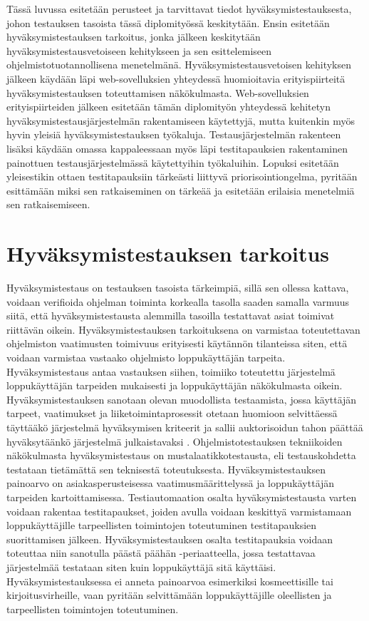 Tässä luvussa esitetään perusteet ja tarvittavat tiedot hyväksymistestauksesta, johon testauksen tasoista tässä diplomityössä keskitytään.
Ensin esitetään hyväksymistestauksen tarkoitus, jonka jälkeen keskitytään hyväksymistestausvetoiseen kehitykseen ja sen esittelemiseen ohjelmistotuotannollisena menetelmänä.
Hyväksymistestausvetoisen kehityksen jälkeen käydään läpi web-sovelluksien yhteydessä huomioitavia erityispiirteitä hyväksymistestauksen toteuttamisen näkökulmasta.
Web-sovelluksien erityispiirteiden jälkeen esitetään tämän diplomityön yhteydessä kehitetyn hyväksymistestausjärjestelmän rakentamiseen käytettyjä, mutta kuitenkin myös hyvin yleisiä hyväksymistestauksen työkaluja.
Testausjärjestelmän rakenteen lisäksi käydään omassa kappaleessaan myös läpi testitapauksien rakentaminen painottuen testausjärjestelmässä käytettyihin työkaluihin.
Lopuksi esitetään yleisestikin ottaen testitapauksiin tärkeästi liittyvä priorisointiongelma, pyritään esittämään miksi sen ratkaiseminen on tärkeää ja esitetään erilaisia menetelmiä sen ratkaisemiseen.

\section{Hyväksymistestauksen tarkoitus} \label{ch:08_hyvaksymistestauksen_tarkoitus}

  Hyväksymistestaus on testauksen tasoista tärkeimpiä, sillä sen ollessa kattava, voidaan verifioida ohjelman toiminta korkealla tasolla saaden samalla varmuus siitä, että hyväksymistestausta alemmilla tasoilla testattavat asiat toimivat riittävän oikein.
  Hyväksymistestauksen tarkoituksena on varmistaa toteutettavan ohjelmiston vaatimusten toimivuus erityisesti käytännön tilanteissa siten, että voidaan varmistaa vastaako ohjelmisto loppukäyttäjän tarpeita.
  Hyväksymistestaus antaa vastauksen siihen, toimiiko toteutettu järjestelmä loppukäyttäjän tarpeiden mukaisesti ja loppukäyttäjän näkökulmasta oikein.
  Hyväksymistestauksen sanotaan olevan muodollista testaamista, jossa käyttäjän tarpeet, vaatimukset ja liiketoimintaprosessit otetaan huomioon selvittäessä täyttääkö järjestelmä hyväksymisen kriteerit ja sallii auktorisoidun tahon päättää hyväksytäänkö järjestelmä julkaistavaksi \parencite{istqb_acceptance_testing_1}.
  Ohjelmistotestauksen tekniikoiden näkökulmasta hyväksymistestaus on mustalaatikkotestausta, eli testauskohdetta testataan tietämättä sen teknisestä toteutuksesta.
  Hyväksymistestauksen painoarvo on asiakasperusteisessa vaatimusmäärittelyssä ja loppukäyttäjän tarpeiden kartoittamisessa.
  Testiautomaation osalta hyväksymistestausta varten voidaan rakentaa testitapaukset, joiden avulla voidaan keskittyä varmistamaan loppukäyttäjille tarpeellisten toimintojen toteutuminen testitapauksien suorittamisen jälkeen.
  Hyväksymistestauksen osalta testitapauksia voidaan toteuttaa niin sanotulla päästä päähän -periaatteella, jossa testattavaa järjestelmää testataan siten kuin loppukäyttäjä sitä käyttäisi.
  Hyväksymistestauksessa ei anneta painoarvoa esimerkiksi kosmeettisille tai kirjoitusvirheille, vaan pyritään selvittämään loppukäyttäjille oleellisten ja tarpeellisten toimintojen toteutuminen.

